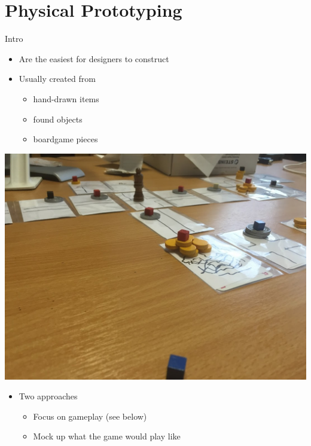 \part{Physical Prototyping}
\frame{\partpage}

\begin{frame}{Intro}
	\begin{itemize}
		\item Are the easiest for designers to construct
		\item Usually created from 
		\begin{itemize}
			\item hand-drawn items
			\item found objects
			\item boardgame pieces
		\end{itemize}
	\end{itemize}
\end{frame}

\begin{frame}
	\includegraphics[width=1.0\textwidth]{board_game_prototype}
\end{frame}

\begin{frame}
	\begin{itemize}
		\item Two approaches
		\begin{itemize}
			\item Focus on gameplay (see below)
			\item Mock up what the game would play like
		\end{itemize}
	\end{itemize}
\end{frame}

